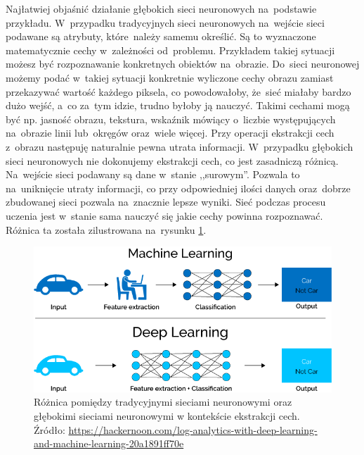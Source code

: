 Najłatwiej objaśnić działanie głębokich sieci neuronowych na~podstawie przykładu. W~przypadku tradycyjnych sieci neuronowych na~wejście sieci podawane są atrybuty, które~należy samemu określić. Są to wyznaczone matematycznie cechy w~zależności od~problemu. Przykładem takiej sytuacji możesz być rozpoznawanie konkretnych obiektów na~obrazie. Do~sieci neuronowej możemy podać w~takiej sytuacji konkretnie wyliczone cechy obrazu zamiast przekazywać wartość każdego piksela, co powodowałoby, że~sieć miałaby bardzo dużo wejść, a~co za~tym idzie, trudno byłoby ją nauczyć. Takimi cechami mogą być np. jasność obrazu, tekstura, wskaźnik mówiący o~liczbie występujących na~obrazie linii lub~okręgów oraz~wiele więcej. Przy operacji ekstrakcji cech z~obrazu następuję naturalnie pewna utrata informacji. W~przypadku głębokich sieci neuronowych nie dokonujemy ekstrakcji cech, co jest zasadniczą różnicą. Na~wejście sieci podawany są dane w~stanie ,,surowym''. Pozwala to na~uniknięcie utraty informacji, co przy odpowiedniej ilości danych oraz~dobrze zbudowanej sieci pozwala na~znacznie lepsze wyniki. Sieć podczas procesu uczenia jest w~stanie sama nauczyć się jakie cechy powinna rozpoznawać. Różnica ta została zilustrowana na~rysunku \ref{dnnDiff}.

\begin{figure}[ht!]
\centering
\includegraphics[scale=0.5]{res/dnn1.png}
\caption[Caption for LOF]{Różnica pomiędzy tradycyjnymi sieciami neuronowymi oraz głębokimi sieciami neuronowymi w kontekście ekstrakcji cech. Źródło: \url{https://hackernoon.com/log-analytics-with-deep-learning-and-machine-learning-20a1891ff70e}\label{dnnDiff}} 
\end{figure}

